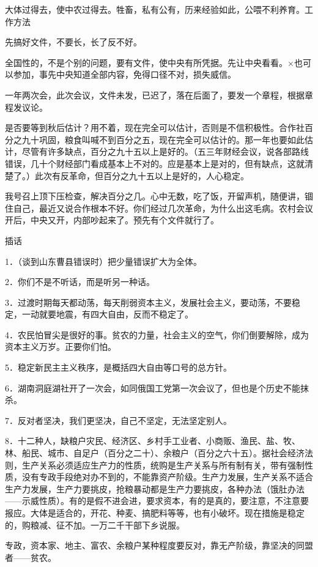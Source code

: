 大体过得去，使中农过得去。牲畜，私有公有，历来经验如此，公喂不利养育。工作方法

先搞好文件，不要长，长了反不好。

全国性的，不是个别的问题，要有文件，使中央有所凭据。先让中央看看。×也可以参加，事先中央知道全部内容，免得口径不对，损失威信。

一年两次会，此次会议，文件未发，已迟了，落在后面了，要发一个章程，根据章程发议论。

是否要等到秋后估计？用不着，现在完全可以估计，否则是不信积极性。合作社百分之九十巩固，粮食叫喊不到百分之五，现在完全可以估计的。那一年也要如此估计，尽管有许多缺点，百分之九十五以上是好的。（五三年财经会议，说各部路线错误，几十个财经部门看成基本上不对的。应是基本上是对的，但有缺点，这就清楚了。）此次有反革命，但百分之九十五以上是好的，人心稳定。

我号召上顶下压检查，解决百分之几。心中无数，吃了饭，开留声机，随便讲，锢住自己，最近又说合作根本不好。你们经过几次革命，为什么出这毛病。农村会议开后，中央又开，内部吵起来了。预先有个文件就行了。

插话

1．（谈到山东曹县错误时）把少量错误扩大为全体。

2．你们不是不听话，而是听另一种话。

3．过渡时期每天都动荡，每天削弱资本主义，发展社会主义，要动荡，不要稳定，一动就要地震，有四大自由，反而不稳定了。

4．农民怕冒尖是很好的事。贫农的力量，社会主义的空气，你们倒要解除，成为资本主义万岁。正要你们怕。

5．稳定新民主主义秩序，是概括四大自由等口号的总方针。

6．湖南洞庭湖社开了一次会，如同俄国工党第一次会议了，但也是个历史不能抹杀。

7．反对者坚决，我们更坚决，自己不坚定，无法坚定别人。

8．十二种人，缺粮户灾民、经济区、乡村手工业者、小商贩、渔民、盐、牧、林、船民、城市、自足户（百分之二十）、余粮户（百分之六十五）。据社会经济法则，生产关系必须适应生产力的性质，统购是生产关系与所有制有关，带有强制性质，没有专政手段绝对办不到的，不能靠资产阶级。生产力发展，生产关系不适合生产力发展，生产力要挑皮，抢粮暴动都是生产力要挑皮，各种办法（饿肚办法——示威性质）。有的是假不进会进，要求资本，有的是真的，要注意，不注意要报应。大体是适合的，开花、种麦、搞肥料等等，也有小破坏。现在措施是稳定的，购粮减、征不加。一万二千干部下乡说服。

专政，资本家、地主、富农、余粮户某种程度要反对，靠无产阶级，靠坚决的同盟者——贫农。

